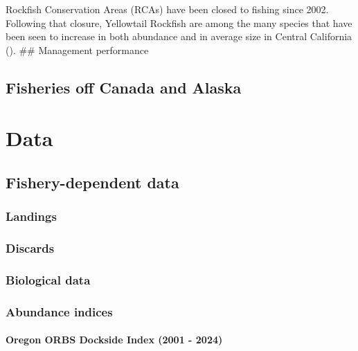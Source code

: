 \documentclass[
]{scrartcl}
\let\oldparagraph\paragraph
\renewcommand{\paragraph}[1]{\oldparagraph{#1}\mbox{}}
\begin{document}
Rockfish Conservation Areas (RCAs) have been closed to fishing since
2002. Following that closure, Yellowtail Rockfish are among the many
species that have been seen to increase in both abundance and in average
size in Central California (). \#\# Management performance

\subsection{Fisheries off Canada and
Alaska}\label{fisheries-off-canada-and-alaska}

\newpage{}

\section{Data}\label{data}

\subsection{Fishery-dependent data}\label{fishery-dependent-data}

\subsubsection{Landings}\label{landings}

\subsubsection{Discards}\label{discards}

\subsubsection{Biological data}\label{biological-data}

\subsubsection{Abundance indices}\label{abundance-indices}

\paragraph{Oregon ORBS Dockside Index (2001 -
2024)}\label{oregon-orbs-dockside-index-2001---2024}
\end{document}
